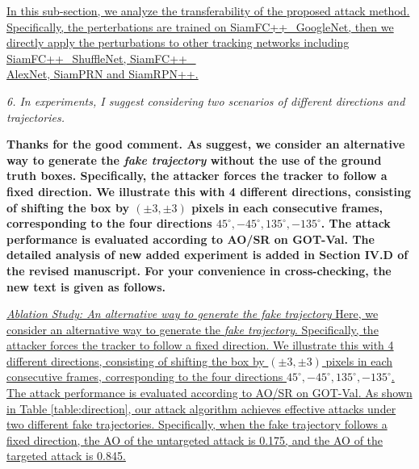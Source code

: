 \documentclass[12pt]{article}
\begin{document}
\uline{In this sub-section, we analyze the transferability of the proposed attack method. Specifically, the perterbations are trained on SiamFC++\_GoogleNet, then we directly apply the perturbations to other tracking networks including SiamFC++\_ShuffleNet, SiamFC++\_\\AlexNet, SiamPRN and SiamRPN++.}

\textit{6. In experiments, I suggest considering two scenarios of different directions and trajectories.}

\textbf{Thanks for the good comment. As suggest, we consider an alternative way to generate the \textit{fake trajectory} without the use of the ground truth boxes. Specifically, the attacker forces the tracker to follow a fixed direction. We illustrate this with 4 different directions, consisting of shifting the box by $(\pm 3, \pm 3)$ pixels in each consecutive frames, corresponding to the four directions $45^{\circ}, -45^{\circ}, 135^{\circ}, -135^{\circ}$.
The attack performance is evaluated according to AO/SR on GOT-Val.
The detailed analysis of new added experiment is added in Section IV.D of the revised manuscript. For your convenience in cross-checking, the new text is given as follows.}

\uline{\textit{Ablation Study: An alternative way to generate the fake trajectory} Here, we consider an alternative way to generate the \textit{fake trajectory}. Specifically, the attacker forces the tracker to follow a fixed direction. We illustrate this with 4 different directions, consisting of shifting the box by $(\pm 3, \pm 3)$ pixels in each consecutive frames, corresponding to the four directions $45^{\circ}, -45^{\circ}, 135^{\circ}, -135^{\circ}$.
The attack performance is evaluated according to AO/SR on GOT-Val.
As shown in Table \ref{table:direction}, our attack algorithm achieves effective attacks under two different fake trajectories. Specifically, when the fake trajectory follows a fixed direction, the AO of the untargeted attack is 0.175, and the AO of the targeted attack is 0.845.}
\end{document}
